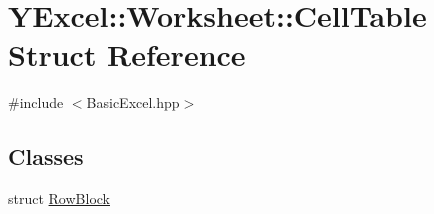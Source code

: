 \hypertarget{struct_y_excel_1_1_worksheet_1_1_cell_table}{}\section{Y\+Excel\+:\+:Worksheet\+:\+:Cell\+Table Struct Reference}
\label{struct_y_excel_1_1_worksheet_1_1_cell_table}


{\ttfamily \#include $<$Basic\+Excel.\+hpp$>$}

\subsection*{Classes}
\begin{DoxyCompactItemize}
\item 
struct \hyperlink{struct_y_excel_1_1_worksheet_1_1_cell_table_1_1_row_block}{Row\+Block}
\end{DoxyCompactItemize}
